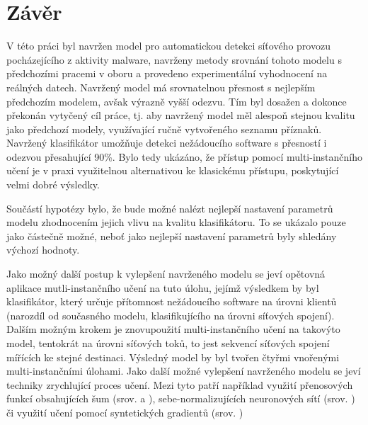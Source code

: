 \chapter*{Závěr}

V této práci byl navržen model pro automatickou detekci síťového provozu pocházejícího z aktivity malware, navrženy metody srovnání tohoto modelu s předchozími pracemi v oboru a provedeno experimentální vyhodnocení na reálných datech. Navržený model má srovnatelnou přesnost s nejlepším předchozím modelem, avšak výrazně vyšší odezvu. Tím byl dosažen a dokonce překonán vytyčený cíl práce, tj. aby navržený model měl alespoň stejnou kvalitu jako předchozí modely, využívající ručně vytvořeného seznamu příznaků. Navržený klasifikátor umožňuje detekci nežádoucího software s přesností i odezvou přesahující 90\%. Bylo tedy ukázáno, že přístup pomocí multi-instančního učení je v praxi využitelnou alternativou ke klasickému přístupu, poskytující velmi dobré výsledky.

Součástí hypotézy bylo, že bude možné nalézt nejlepší nastavení parametrů modelu zhodnocením jejich vlivu na kvalitu klasifikátoru. To se ukázalo pouze jako částečně možné, neboť jako nejlepší nastavení parametrů byly shledány výchozí hodnoty. 

Jako možný další postup k vylepšení navrženého modelu se jeví opětovná aplikace mutli-instančního učení na tuto úlohu, jejímž výsledkem by byl klasifikátor, který určuje přítomnost nežádoucího software na úrovni klientů (narozdíl od současného modelu, klasifikujícího na úrovni síťových spojení). Dalším možným krokem je znovupoužití multi-instančního učení na takovýto model, tentokrát na úrovni síťových toků, to jest sekvencí síťových spojení mířících ke stejné destinaci. Výsledný model by byl tvořen čtyřmi vnořenými multi-instančními úlohami. Jako další možné vylepšení navrženého modelu se jeví techniky zrychlující proces učení. Mezi tyto patří například využití přenosových funkcí obsahujících šum (srov. \cite{gulcehre_noisy_2016} a \cite{czarnecki_understanding_2017}), sebe-normalizujících neuronových sítí (srov. \cite{klambauer_self-normalizing_2017}) či využití učení pomocí syntetických gradientů (srov. \cite{jaderberg_decoupled_2016})
